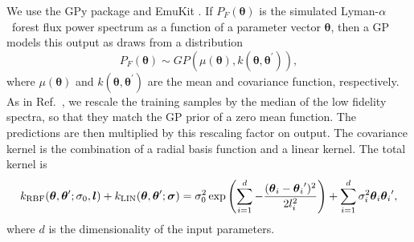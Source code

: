 \documentclass[a4paper,11pt]{article}
\newcommand{\Lya}{Lyman-$\alpha$}
\begin{document}

We use the GPy package \cite{gpy2014} and EmuKit \cite{2021arXiv211013293P}. If $P_F(\boldsymbol{\theta})$ is the simulated \Lya~forest flux power spectrum as a function of a parameter vector $\boldsymbol{\theta}$, then a GP models this output as draws from a distribution
\begin{equation}
    P_F(\boldsymbol{\theta}) \sim GP(\mu(\boldsymbol{\theta}), k(\boldsymbol{\theta}, \boldsymbol{\theta}^{\prime})),
\end{equation}
where $\mu(\boldsymbol{\theta})$ and $k(\boldsymbol{\theta}, \boldsymbol{\theta}^{\prime})$ are the mean and covariance function, respectively.
As in Ref.~\cite{Fernandez:2022}, we rescale the training samples by the median of the low fidelity spectra, so that they match the GP prior of a zero mean function. The predictions are then multiplied by this rescaling factor on output. The covariance kernel is the combination of a radial basis function and a linear kernel. The total kernel is
\begin{equation}
        k_\mathrm{RBF}(\boldsymbol{\theta}, \boldsymbol{\theta}'; \sigma_0, \boldsymbol{l}) + k_\mathrm{LIN}(\boldsymbol{\theta}, \boldsymbol{\theta}'; \boldsymbol{\sigma})\\
        = \sigma_0^2 \exp{\left( \sum_{i=1}^{d} -\frac{(\boldsymbol{\theta}_i - {\boldsymbol{\theta}_i}')^2}{2 l_i^2} \right)} +  \sum_{i=1}^{d} \sigma_i^2 \boldsymbol{\theta}_i {\boldsymbol{\theta}_i}',
        \label{eq:kernel}
\end{equation}
where $d$ is the dimensionality of the input parameters.
\end{document}
